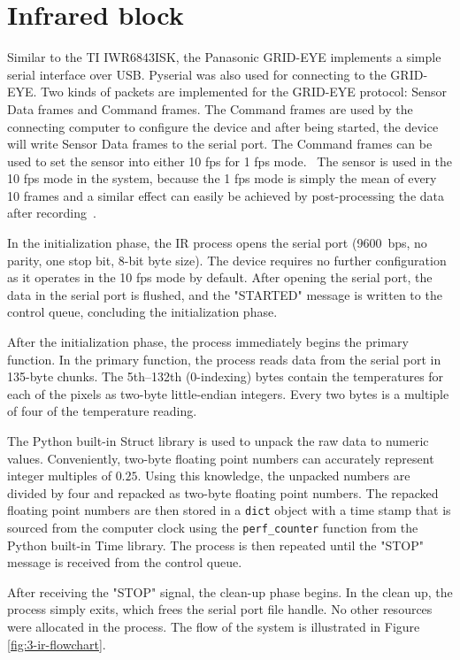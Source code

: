 \section{Infrared block}
\label{sec:3-ir}
Similar to the TI IWR6843ISK, the Panasonic GRID-EYE implements a simple serial interface over USB.
Pyserial was also used for connecting to the GRID-EYE.
Two kinds of packets are implemented for the GRID-EYE protocol: Sensor Data frames and Command frames.
The Command frames are used by the connecting computer to configure the device and after being started,
the device will write Sensor Data frames to the serial port.
The Command frames can be used to set the sensor into either 10 \gls{fps} for 1 \gls{fps} mode.~\cite{grid-eye-protocol}
The sensor is used in the 10 \gls{fps} mode in the system, because the 1 \gls{fps} mode is simply the mean of every 10 frames
and a similar effect can easily be achieved by post-processing the data after recording~\cite{grid-eye-manual}.

In the initialization phase, the IR process opens the serial port (9600~bps, no parity, one stop bit, 8-bit byte size).
The device requires no further configuration as it operates in the 10 \gls{fps} mode by default.
After opening the serial port, the data in the serial port is flushed,
and the "STARTED" message is written to the control queue,
concluding the initialization phase.

After the initialization phase, the process immediately begins the primary function.
In the primary function, the process reads data from the serial port in 135-byte chunks.
The 5th--132th (0-indexing) bytes contain the temperatures for each of the pixels as two-byte little-endian integers.
Every two bytes is a multiple of four of the temperature reading.

The Python built-in Struct library is used to unpack the raw data to numeric values.
Conveniently, two-byte floating point numbers can accurately represent integer multiples of $0.25$.
Using this knowledge, the unpacked numbers are divided by four and repacked as two-byte floating point numbers.
The repacked floating point numbers are then stored in a \texttt{dict} object with a time stamp that is sourced 
from the computer clock using the \texttt{perf\_counter} function from the Python built-in Time library.
The process is then repeated until the "STOP" message is received from the control queue.

After receiving the "STOP" signal, the clean-up phase begins.
In the clean up, the process simply exits,
which frees the serial port file handle.
No other resources were allocated in the process.
The flow of the system is illustrated in Figure \ref{fig:3-ir-flowchart}.

